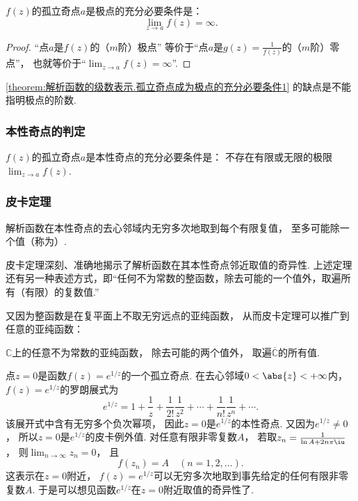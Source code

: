 \begin{corollary}\label{theorem:解析函数的级数表示.孤立奇点成为极点的充分必要条件1}
\(f(z)\)的孤立奇点\(a\)是极点的充分必要条件是：\[
	\lim_{z \to a} f(z) = \infty.
\]
\begin{proof}
“点\(a\)是\(f(z)\)的（\(m\)阶）极点”
等价于“点\(a\)是\(g(z) = \frac{1}{f(z)}\)的（\(m\)阶）零点”，
也就等价于“\(\lim_{z \to a} f(z) = \infty\)”.
\end{proof}
\end{corollary}
\cref{theorem:解析函数的级数表示.孤立奇点成为极点的充分必要条件1} 的缺点是不能指明极点的阶数.

\subsubsection{本性奇点的判定}
\begin{theorem}
\(f(z)\)的孤立奇点\(a\)是本性奇点的充分必要条件是：
不存在有限或无限的极限\(\lim_{z \to a} f(z)\).
\end{theorem}

\subsubsection{皮卡定理}
\begin{theorem}[皮卡定理]
解析函数在本性奇点的去心邻域内无穷多次地取到每个有限复值，
至多可能除一个值（称为）.
\end{theorem}
皮卡定理深刻、准确地揭示了解析函数在其本性奇点邻近取值的奇异性.
上述定理还有另一种表述方式，即“任何不为常数的整函数，除去可能的一个值外，取遍所有（有限）的复数值.”

又因为整函数是在复平面上不取无穷远点的亚纯函数，
从而皮卡定理可以推广到任意的亚纯函数：
\begin{theorem}
\(\mathbb{C}\)上的任意不为常数的亚纯函数，
除去可能的两个值外，
取遍\(\overline{\mathbb{C}}\)的所有值.
\end{theorem}

\begin{example}
点\(z=0\)是函数\(f(z) = e^{1/z}\)的一个孤立奇点.
在去心邻域\(0<\abs{z}<+\infty\)内，
\(f(z) = e^{1/z}\)的罗朗展式为\[
	e^{1/z}
	= 1 + \frac{1}{z}
	+ \frac{1}{2!} \frac{1}{z^2}
	+ \dotsb
	+ \frac{1}{n!} \frac{1}{z^n}
	+ \dotsb.
\]
该展开式中含有无穷多个负次幂项，
因此\(z=0\)是\(e^{1/z}\)的本性奇点.
又因为\(e^{1/z}\neq0\)，
所以\(z=0\)是\(e^{1/z}\)的皮卡例外值.
对任意有限非零复数\(A\)，
若取\(z_n = \frac{1}{\ln A + 2n\pi\iu}\)，
则\(\lim_{n\to\infty} z_n = 0\)，
且\[
	f(z_n) = A
	\quad(n=1,2,\dotsc).
\]
这表示在\(z=0\)附近，
\(f(z) = e^{1/z}\)可以无穷多次地取到事先给定的任何有限非零复数\(A\).
于是可以想见函数\(e^{1/z}\)在\(z=0\)附近取值的奇异性了.
\end{example}

